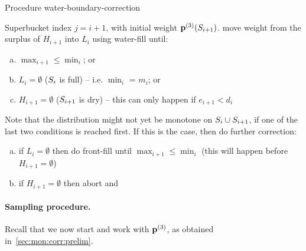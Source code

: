 \begin{algorithm}[H]
  \caption{Procedure \textsf{water-boundary-correction}}
  \begin{algorithmic}[1]
    \Require Superbucket index $j=i+1$, {with initial weight $\mathbf{p}^{(3)}(S_{i+1})$.}
   \State move weight from the surplus of $H_{i+1}$ into $L_{i}$ using \textsf{water-fill} until:
    \begin{enumerate}[(a)]
      \item $\max_{i+1} \leq \min_i$; or
      \item $L_{i}=\emptyset$ ($S_i$ is full) -- i.e. $\min_i$ = $m_i$; or
      \item $H_{i+1}=\emptyset$ ($S_{i+1}$ is dry) -- this can only happen if $e_{i+1} < d_i$ 
    \end{enumerate}
  \State Note that the distribution might not yet be monotone on $S_i\cup S_{i+1}$, if one of the last two conditions is reached first. If this is the case, then do further correction:
    \begin{enumerate}[(a)]
      \item if $L_{i}=\emptyset$  then do \textsf{front-fill} until $\max_{i+1} \leq \min_i$  (this will happen before $H_{i+1}=\emptyset$)
      \item if $H_{i+1}=\emptyset$ then abort and \Return \fail {}
          \end{enumerate}
  \end{algorithmic}
  \end{algorithm}

\paragraph{Sampling procedure.}
Recall that we now start and work with $\mathbf{p}^{(3)}$, as obtained in~\cref{sec:mon:corr:prelim}.

